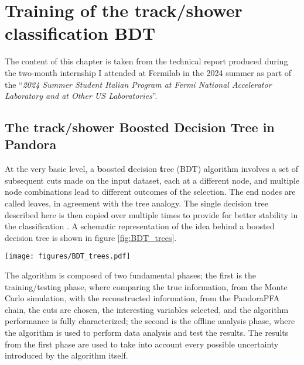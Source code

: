 \chapter{Training of the track/shower classification BDT}

The content of this chapter is taken from the technical report produced during the two-month internship I attended at Fermilab in the 2024 summer as part of the ``\emph{2024 Summer Student Italian Program at Fermi National Accelerator Laboratory and at Other US Laboratories}''. 

\section{The track/shower Boosted Decision Tree in Pandora} \label{sec:A_bdt}

At the very basic level, a \textbf{b}oosted \textbf{d}ecision \textbf{t}ree (BDT) algorithm involves a set of subsequent cuts made on the input dataset, each at a different node, and multiple node combinations lead to different outcomes of the selection. The end nodes are called leaves, in agreement with the tree analogy. The single decision tree described here is then copied over multiple times to provide for better stability in the classification \cite{Cornell:2021gut, FREUND1997119}. A schematic representation of the idea behind a boosted decision tree is shown in figure \ref{fig:BDT_trees}. 

\begin{figure*}
    \centering
    \texttt{[image: figures/BDT\_trees.pdf]}
    \caption{The underlying structure of a Boosted Decision Tree algorithm, showing the individual subsequent trees. In the inset plots, the performance of a single Decision Tree classifier is compared to the Boosted version, implemented in the AdaBoost \cite{FREUND1997119} algorithm.}
    \label{fig:BDT_trees}
\end{figure*}

The algorithm is composed of two fundamental phases; the first is the training/testing phase, where comparing the true information, from the Monte Carlo simulation, with the reconstructed information, from the PandoraPFA chain, the cuts are chosen, the interesting variables selected, and the algorithm performance is fully characterized; the second is the offline analysis phase, where the algorithm is used to perform data analysis and test the results. The results from the first phase are used to take into account every possible uncertainty introduced by the algorithm itself. 


